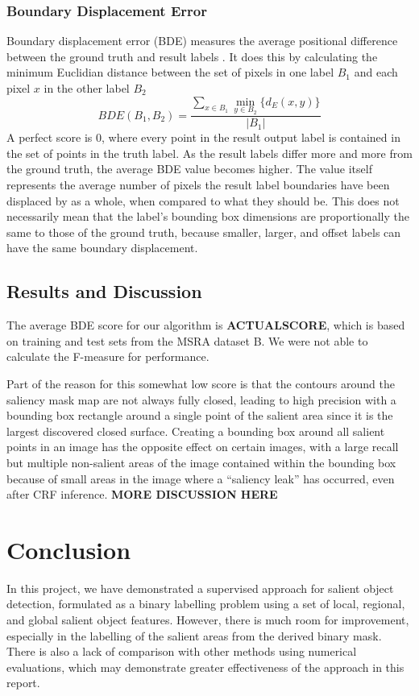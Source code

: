 \documentclass[10pt,twocolumn,letterpaper]{article}
\newcommand{\SUM}{\sum\limits}
\newcommand{\BOLD}{\textbf}
\begin{document}
\subsubsection{Boundary Displacement Error}
Boundary displacement error (BDE) measures the average positional difference between the ground truth and result labels \cite{bde}.  It does this by calculating the minimum Euclidian distance between the set of pixels in one label $B_1$ and each pixel $x$ in the other label $B_2$ $$BDE(B_1,B_2)=\frac{\SUM_{x\in B_1}\min\limits_{y\in B_2}\{d_E(x,y)\}}{|B_1|}$$  A perfect score is 0, where every point in the result output label is contained in the set of points in the truth label.  As the result labels differ more and more from the ground truth, the average BDE value becomes higher.  The value itself represents the average number of pixels the result label boundaries have been displaced by as a whole, when compared to what they should be.  This does not necessarily mean that the label's bounding box dimensions are proportionally the same to those of the ground truth, because smaller, larger, and offset labels can have the same boundary displacement. 


\subsection{Results and Discussion}
The average BDE score for our algorithm is \BOLD{ACTUALSCORE}, which is based on training and test sets from the MSRA dataset B.  We were not able to calculate the F-measure for performance.

Part of the reason for this somewhat low score is that the contours around the saliency mask map are not always fully closed, leading to high precision with a bounding box rectangle around a single point of the salient area since it is the largest discovered closed surface.  Creating a bounding box around all salient points in an image has the opposite effect on certain images, with a large recall but multiple non-salient areas of the image contained within the bounding box because of small areas in the image where a ``saliency leak'' has occurred, even after CRF  inference. \BOLD{\Huge{MORE DISCUSSION HERE}}


\section{Conclusion}
In this project, we have demonstrated a supervised approach for salient object detection, formulated as a binary labelling problem using a set of local, regional, and global salient object features.  However, there is much room for improvement, especially in the labelling of the salient areas from the derived binary mask.  There is also a lack of comparison with other methods using numerical evaluations, which may demonstrate greater effectiveness of the approach in this report.
\end{document}
